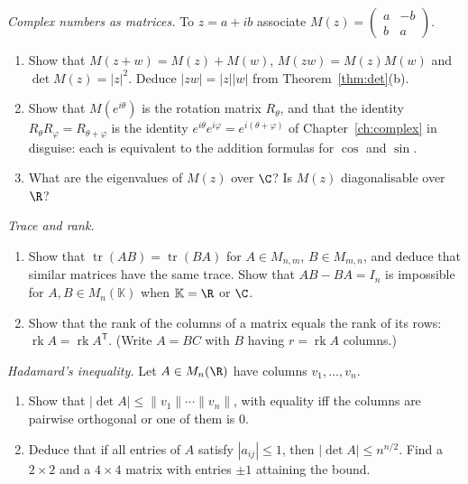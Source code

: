 \begin{exercise}[$\star$]\label{ex:twobytwo}
\emph{Complex numbers as matrices.} To $z=a+ib$ associate $M(z)=\begin{pmatrix}a&-b\\b&a\end{pmatrix}$.
\begin{enumerate}[label=(\alph*)]
\item Show that $M(z+w)=M(z)+M(w)$, $M(zw)=M(z)M(w)$ and $\det M(z)=|z|^2$. Deduce $|zw|=|z||w|$ from Theorem~\ref{thm:det}(b).
\item Show that $M(e^{i\theta})$ is the rotation matrix $R_\theta$, and that the identity $R_\theta R_\varphi=R_{\theta+\varphi}$ is the identity $e^{i\theta}e^{i\varphi}=e^{i(\theta+\varphi)}$ of Chapter~\ref{ch:complex} in disguise: each is equivalent to the addition formulas for $\cos$ and $\sin$.
\item What are the eigenvalues of $M(z)$ over $\C$? Is $M(z)$ diagonalisable over $\R$?
\end{enumerate}
\end{exercise}

\begin{exercise}[$\star\star$]\label{ex:tracerank}
\emph{Trace and rank.}
\begin{enumerate}[label=(\alph*)]
\item Show that $\operatorname{tr}(AB)=\operatorname{tr}(BA)$ for $A\in M_{n,m}$, $B\in M_{m,n}$, and deduce that similar matrices have the same trace. Show that $AB-BA=I_n$ is impossible for $A,B\in M_n(\mathbb K)$ when $\mathbb K=\R$ or $\C$.
\item Show that the rank of the columns of a matrix equals the rank of its rows: $\operatorname{rk}A=\operatorname{rk}A^{\mathsf T}$. (Write $A=BC$ with $B$ having $r=\operatorname{rk}A$ columns.)
\end{enumerate}
\end{exercise}

\begin{exercise}[$\star\star$]\label{ex:hadamard}
\emph{Hadamard's inequality.} Let $A\in M_n(\R)$ have columns $v_1,\dots,v_n$.
\begin{enumerate}[label=(\alph*)]
\item Show that $|\det A|\le\|v_1\|\cdots\|v_n\|$, with equality iff the columns are pairwise orthogonal or one of them is $0$.
\item Deduce that if all entries of $A$ satisfy $|a_{ij}|\le1$, then $|\det A|\le n^{n/2}$. Find a $2\times2$ and a $4\times4$ matrix with entries $\pm1$ attaining the bound.
\end{enumerate}
\end{exercise}

